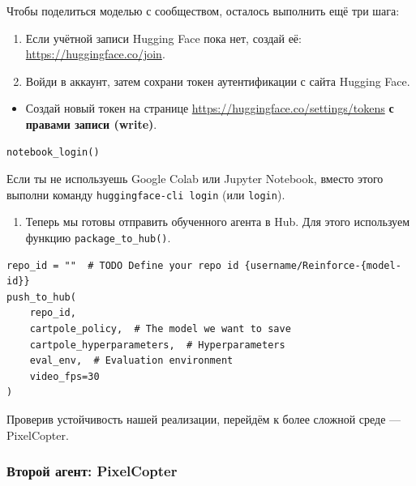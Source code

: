 \documentclass[11pt,a4paper]{article}
\begin{document}
Чтобы поделиться моделью с сообществом, осталось выполнить ещё три шага:

\begin{enumerate}
\def\labelenumi{\arabic{enumi}.}
\item
  Если учётной записи Hugging Face пока нет, создай её: \url{https://huggingface.co/join}.
\item
  Войди в аккаунт, затем сохрани токен аутентификации с сайта Hugging Face.
\end{enumerate}

\begin{itemize}
\tightlist
\item
  Создай новый токен на странице \url{https://huggingface.co/settings/tokens} \textbf{с правами записи (write)}.
\end{itemize}


\begin{lstlisting}
notebook_login()
\end{lstlisting}

Если ты не используешь Google Colab или Jupyter Notebook, вместо этого выполни команду \texttt{huggingface-cli\ login} (или \texttt{login}).

\begin{enumerate}
\def\labelenumi{\arabic{enumi}.}
\setcounter{enumi}{2}
\tightlist
\item
  Теперь мы готовы отправить обученного агента в Hub. Для этого используем функцию \texttt{package\_to\_hub()}.
\end{enumerate}

\begin{lstlisting}
repo_id = ""  # TODO Define your repo id {username/Reinforce-{model-id}}
push_to_hub(
    repo_id,
    cartpole_policy,  # The model we want to save
    cartpole_hyperparameters,  # Hyperparameters
    eval_env,  # Evaluation environment
    video_fps=30
)
\end{lstlisting}

Проверив устойчивость нашей реализации, перейдём к более сложной среде --- PixelCopter.

\subsubsection{Второй агент: PixelCopter}\label{second-agent-pixelcopter}
\end{document}
